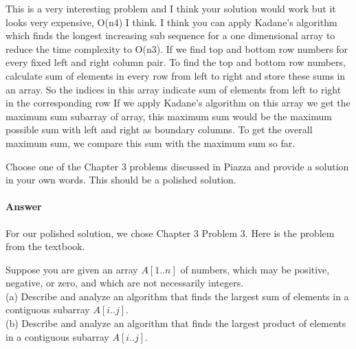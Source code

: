 \documentclass{article}
\begin{document}
\begin{enumerate}
        This is a very interesting problem and I think your solution would work but it looks very expensive, O(n4) I think. I think you can apply Kadane’s algorithm which finds the longest increasing sub sequence for a one dimensional array to reduce the time complexity to O(n3). If we find top and bottom row numbers for every fixed left and right column pair. To find the top and bottom row numbers, calculate sum of elements in every row from left to right and store these sums in an array. So the indices in this array indicate sum of elements from left to right in the corresponding row If we apply Kadane’s  algorithm on this array we get the maximum sum subarray of array, this maximum sum would be the maximum possible sum with left and right as boundary columns. To get the overall maximum sum, we compare this sum with the maximum sum so far.
        
\end{enumerate}


\nextprob
{}

Choose one of the Chapter 3 problems discussed in Piazza and provide a solution
in your own words.  This should be a polished solution.

\paragraph{Answer}

For our polished solution, we chose Chapter 3 Problem 3.
Here is the problem from the textbook.

Suppose you are given an array $A[1 .. n]$ of numbers, which may be positive, negative, or zero, and which are not necessarily integers. \\
(a) Describe and analyze an algorithm that finds the largest sum of elements in a contiguous subarray $A[i .. j]$. \\
(b) Describe and analyze an algorithm that finds the largest product of elements in a contiguous subarray $A[i .. j]$.
\end{document}
